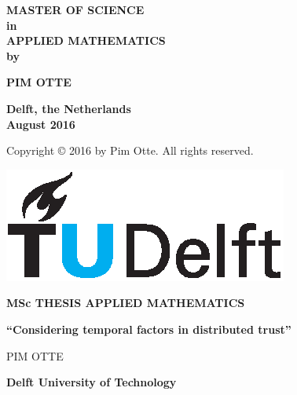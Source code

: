 \documentclass[a4paper,11pt]{book}
\theoremstyle{definition}
\begin{document}
\begin{titlepage}
\begin{center}
\textbf{\large{MASTER OF SCIENCE} \\
in \\
\large{APPLIED MATHEMATICS} \\
\vspace{1cm}
by}

\vspace{1cm}

\textbf{PIM OTTE}\\


\textbf{Delft, the Netherlands \\
August 2016} \\

\vspace{1cm}

Copyright \copyright{} 2016 by Pim Otte. All rights reserved.
\end{center}

\end{titlepage}

\newpage

\thispagestyle{empty}

\quad

\newpage

\thispagestyle{empty}

\hspace{10cm}
\begin{minipage}{5cm}
  \includegraphics{tudelft.eps}
\end{minipage}

\begin{center}

\textbf{\large{MSc THESIS APPLIED MATHEMATICS}}

\vspace{1.5cm}

\textbf{``Considering temporal factors in distributed trust''}

\vspace{1.5cm}

PIM OTTE\\

\vspace{1.5cm}

\textbf{\large{Delft University of Technology}}


\end{center}
\end{document}

